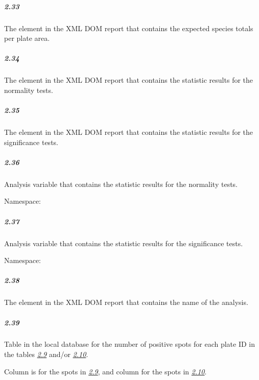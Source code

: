 \documentclass[letterpaper,10pt,english]{sphinxmanual}
\begin{document}
\subparagraph{2.33}
\label{design_parts_data:design-part-data-2-33}\label{design_parts_data:id40}
The element  in the XML DOM report that contains
the expected species totals per plate area.


\subparagraph{2.34}
\label{design_parts_data:design-part-data-2-34}\label{design_parts_data:id41}
The element  in the XML DOM report that contains
the statistic results for the normality tests.


\subparagraph{2.35}
\label{design_parts_data:design-part-data-2-35}\label{design_parts_data:id42}
The element  in the XML DOM report that
contains the statistic results for the significance tests.


\subparagraph{2.36}
\label{design_parts_data:design-part-data-2-36}\label{design_parts_data:id43}
Analysis variable that contains the statistic results for the normality
tests.
\begin{description}
\item[{Namespace:}] \leavevmode
{}

\end{description}


\subparagraph{2.37}
\label{design_parts_data:design-part-data-2-37}\label{design_parts_data:id44}
Analysis variable that contains the statistic results for the
significance tests.
\begin{description}
\item[{Namespace:}] \leavevmode
{}

\end{description}


\subparagraph{2.38}
\label{design_parts_data:id45}\label{design_parts_data:design-part-data-2-38}
The element  in the XML DOM report that contains the name of
the analysis.


\subparagraph{2.39}
\label{design_parts_data:id46}\label{design_parts_data:design-part-data-2-39}
Table  in the local database for the number of
positive spots for each plate ID in the tables {\hyperref[design_parts_data:design-part-data-2-9]{\emph{2.9}}}
and/or {\hyperref[design_parts_data:design-part-data-2-10]{\emph{2.10}}}.

Column  is for the spots in {\hyperref[design_parts_data:design-part-data-2-9]{\emph{2.9}}}, and
column  for the spots in {\hyperref[design_parts_data:design-part-data-2-10]{\emph{2.10}}}.
\end{document}
